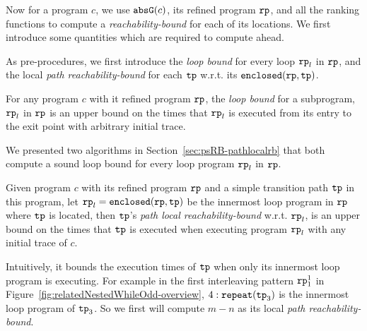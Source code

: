 
Now for a program $c$, we use $\mathtt{abs}{\mathtt{G}}(c)$, its refined program $\mathtt{rp}$, and all the ranking functions to compute a \emph{reachability-bound} for each of its locations.
We first introduce some quantities which are required to compute ahead.

As pre-procedures, we first introduce the \emph{loop bound} for every loop $\mathtt{rp}_l$ in $\mathtt{rp}$, and the local \emph{path reachability-bound} for each $\mathtt{tp}$ w.r.t. its $\mathtt{enclosed}(\mathtt{rp}, \mathtt{tp})$.
\begin{defn}
 For any program $c$ with it refined program $\mathtt{rp}$,
 the \emph{loop bound}
 for a subprogram, $\mathtt{rp}_l$ in $\mathtt{rp}$ is an upper bound on the times that $\mathtt{rp}_l$ is executed from its entry to the exit point with arbitrary initial trace.
\end{defn}
We presented two algorithms in Section~\ref{sec:psRB-pathlocalrb} that both compute a sound loop bound for every loop program $\mathtt{rp}_l$ in $\mathtt{rp}$.
% 
\begin{defn}
 Given program $c$ with its refined program $\mathtt{rp}$ and a simple transition path $\mathtt{tp}$ in this program, 
 let $\mathtt{rp}_l = \mathtt{enclosed}(\mathtt{rp}, \mathtt{tp})$ be the innermost loop program in $\mathtt{rp}$ where $\mathtt{tp}$ is located,
 then $\mathtt{tp}$'s \emph{path local reachability-bound} w.r.t. $\mathtt{rp}_l$, 
 is an upper bound on the times that $\mathtt{tp}$ is executed when executing program $\mathtt{rp}_l$ with any initial trace of $c$.
\end{defn}
Intuitively, it bounds the execution times of $\mathtt{tp}$ when only its innermost loop program is executing.
For example in the first interleaving pattern $\mathtt{rp}_1^1$ in Figure~\ref{fig:relatedNestedWhileOdd-overview}, 
$4:\mathtt{repeat}(\mathtt{tp}_3)$ is the innermost loop program of $\mathtt{tp}_3$.
So we first will compute $m - n$ as its local \emph{path reachability-bound}.

